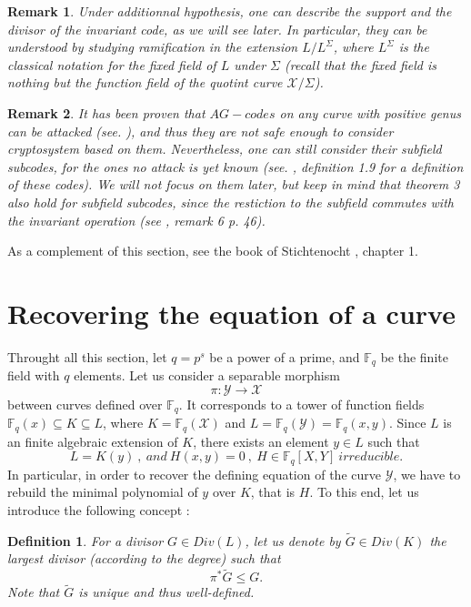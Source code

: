 \documentclass[10pt]{article}
\newtheorem{def1}{Definition}[]
\newtheorem{rq1}{Remark}[]
\newcommand{\s}{\vspace{0.3cm}}
\newcommand{\fq}{\mathbb{F}_q}
\newcommand{\su}{\subseteq}
\newcommand{\X}{\mathcal{X}}
\newcommand{\Y}{\mathcal{Y}}
\begin{document}
\begin{rq1} \rm
Under additionnal hypothesis, one can describe the support and the divisor of the invariant code, as we will see later. In particular, they can be understood by studying ramification in the extension $L / L^{\Sigma}$, where $L^{\Sigma}$ is the classical notation for the fixed field of $L$ under $\Sigma$ (recall that the fixed field is nothing but the function field of the quotint curve $\X/\Sigma$).
\end{rq1}

\s

\begin{rq1} \rm
It has been proven that $AG-codes$ on any curve with positive genus can be attacked (see. \cite{CMP}), and thus they are not safe enough to consider cryptosystem based on them. Nevertheless, one can still consider their subfield subcodes, for the ones no attack is yet known (see. \cite{Bar}, definition 1.9 for a definition of these codes). We will not focus on them later, but keep in mind that theorem 3 also hold for subfield subcodes, since the restiction to the subfield commutes with the invariant operation (see \cite{Bar}, remark 6 p. 46).
\end{rq1}

\s

As a complement of this section, see  the book of Stichtenocht \cite{Sti}, chapter 1. 

\section{Recovering the equation of a curve}

\s

Throught all this section, let $q=p^s$ be a power of a prime, and $\fq$ be the finite field with $q$ elements. Let us consider a separable morphism 
\[\pi : \Y \rightarrow \X\]
between curves defined over $\fq$. It corresponds to a tower of function fields $\fq(x) \su K \su L$, where $K=\fq(\X)$ and $L=\fq(\Y)=\fq(x,y)$. Since $L$ is an finite  algebraic extension of $K$, there exists an element $y \in L$ such that 
\[L = K(y) \ , \ and \ H(x,y)=0 \ , \ H \in \fq[X,Y] \ irreducible.\]
In particular, in order to recover the defining equation of the curve $\Y$, we have to rebuild the minimal polynomial of $y$ over $K$, that is $H$. To this end, let us introduce the following concept :


\s

\begin{def1}
For a divisor $G \in Div(L)$, let us denote by $\tilde{G} \in Div(K)$ the largest divisor (according to the degree) such that
\[\pi^*\tilde{G} \leq G.\]
Note that $\tilde{G}$ is unique and thus well-defined.
\end{def1} 
\end{document}
